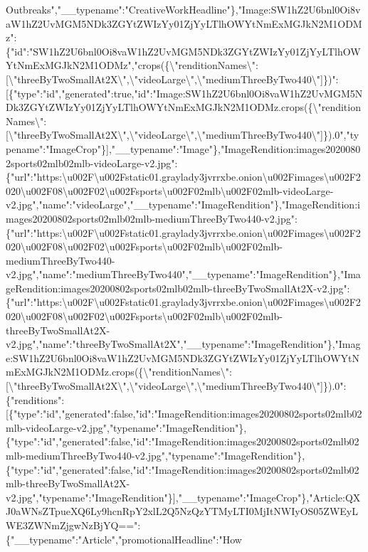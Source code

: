 Outbreaks","\_\_typename":"CreativeWorkHeadline"\},"Image:SW1hZ2U6bnl0Oi8vaW1hZ2UvMGM5NDk3ZGYtZWIzYy01ZjYyLTlhOWYtNmExMGJkN2M1ODMz":\{"id":"SW1hZ2U6bnl0Oi8vaW1hZ2UvMGM5NDk3ZGYtZWIzYy01ZjYyLTlhOWYtNmExMGJkN2M1ODMz","crops(\{\textbackslash{}"renditionNames\textbackslash{}":{[}\textbackslash{}"threeByTwoSmallAt2X\textbackslash{}",\textbackslash{}"videoLarge\textbackslash{}",\textbackslash{}"mediumThreeByTwo440\textbackslash{}"{]}\})":{[}\{"type":"id","generated":true,"id":"Image:SW1hZ2U6bnl0Oi8vaW1hZ2UvMGM5NDk3ZGYtZWIzYy01ZjYyLTlhOWYtNmExMGJkN2M1ODMz.crops(\{\textbackslash{}"renditionNames\textbackslash{}":{[}\textbackslash{}"threeByTwoSmallAt2X\textbackslash{}",\textbackslash{}"videoLarge\textbackslash{}",\textbackslash{}"mediumThreeByTwo440\textbackslash{}"{]}\}).0","typename":"ImageCrop"\}{]},"\_\_typename":"Image"\},"ImageRendition:images20200802sports02mlb02mlb-videoLarge-v2.jpg":\{"url":"https:\textbackslash{}u002F\textbackslash{}u002Fstatic01.graylady3jvrrxbe.onion\textbackslash{}u002Fimages\textbackslash{}u002F2020\textbackslash{}u002F08\textbackslash{}u002F02\textbackslash{}u002Fsports\textbackslash{}u002F02mlb\textbackslash{}u002F02mlb-videoLarge-v2.jpg","name":"videoLarge","\_\_typename":"ImageRendition"\},"ImageRendition:images20200802sports02mlb02mlb-mediumThreeByTwo440-v2.jpg":\{"url":"https:\textbackslash{}u002F\textbackslash{}u002Fstatic01.graylady3jvrrxbe.onion\textbackslash{}u002Fimages\textbackslash{}u002F2020\textbackslash{}u002F08\textbackslash{}u002F02\textbackslash{}u002Fsports\textbackslash{}u002F02mlb\textbackslash{}u002F02mlb-mediumThreeByTwo440-v2.jpg","name":"mediumThreeByTwo440","\_\_typename":"ImageRendition"\},"ImageRendition:images20200802sports02mlb02mlb-threeByTwoSmallAt2X-v2.jpg":\{"url":"https:\textbackslash{}u002F\textbackslash{}u002Fstatic01.graylady3jvrrxbe.onion\textbackslash{}u002Fimages\textbackslash{}u002F2020\textbackslash{}u002F08\textbackslash{}u002F02\textbackslash{}u002Fsports\textbackslash{}u002F02mlb\textbackslash{}u002F02mlb-threeByTwoSmallAt2X-v2.jpg","name":"threeByTwoSmallAt2X","\_\_typename":"ImageRendition"\},"Image:SW1hZ2U6bnl0Oi8vaW1hZ2UvMGM5NDk3ZGYtZWIzYy01ZjYyLTlhOWYtNmExMGJkN2M1ODMz.crops(\{\textbackslash{}"renditionNames\textbackslash{}":{[}\textbackslash{}"threeByTwoSmallAt2X\textbackslash{}",\textbackslash{}"videoLarge\textbackslash{}",\textbackslash{}"mediumThreeByTwo440\textbackslash{}"{]}\}).0":\{"renditions":{[}\{"type":"id","generated":false,"id":"ImageRendition:images20200802sports02mlb02mlb-videoLarge-v2.jpg","typename":"ImageRendition"\},\{"type":"id","generated":false,"id":"ImageRendition:images20200802sports02mlb02mlb-mediumThreeByTwo440-v2.jpg","typename":"ImageRendition"\},\{"type":"id","generated":false,"id":"ImageRendition:images20200802sports02mlb02mlb-threeByTwoSmallAt2X-v2.jpg","typename":"ImageRendition"\}{]},"\_\_typename":"ImageCrop"\},"Article:QXJ0aWNsZTpueXQ6Ly9hcnRpY2xlL2Q5NzQzYTMyLTI0MjItNWIyOS05ZWEyLWE3ZWNmZjgwNzBjYQ==":\{"\_\_typename":"Article","promotionalHeadline":"How
